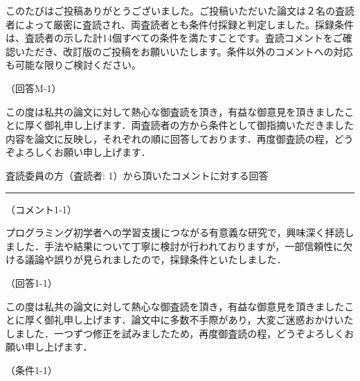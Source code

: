 \documentclass{jarticle} %
\def\section#1{ \vspace{3pc} {\large \gt #1} \vspace{1pc} \hrule }
\def\subsection#1{ \vspace{1pc} {\gt #1} }
\begin{document}
このたびはご投稿ありがとうございました。ご投稿いただいた論文は２名の査読者によって厳密に査読され、両査読者とも条件付採録と判定しました。採録条件は、査読者の示した計14個すべての条件を満たすことです。査読コメントをご確認いただき、改訂版のご投稿をお願いいたします。条件以外のコメントへの対応も可能な限りご検討ください。

\subsection{（回答M-1）}

この度は私共の論文に対して熱心な御査読を頂き，有益な御意見を頂きましたことに厚く御礼申し上げます．両査読者の方から条件として御指摘いただきました内容を論文に反映し，それぞれの順に回答しております．再度御査読の程，どうぞよろしくお願い申し上げます．


\newpage
\section{査読委員の方（査読者: 1）から頂いたコメントに対する回答}

\subsection{（コメント1-1）}

プログラミング初学者への学習支援につながる有意義な研究で，興味深く拝読しました．手法や結果について丁寧に検討が行われておりますが，一部信頼性に欠ける議論や誤りが見られましたので，採録条件といたしました．

\subsection{（回答1-1）}

この度は私共の論文に対して熱心な御査読を頂き，有益な御意見を頂きましたことに厚く御礼申し上げます．論文中に多数不手際があり，大変ご迷惑おかけいたしました．一つずつ修正を試みましたため，再度御査読の程，どうぞよろしくお願い申し上げます．


\subsection{（条件1-1）}
\end{document}
